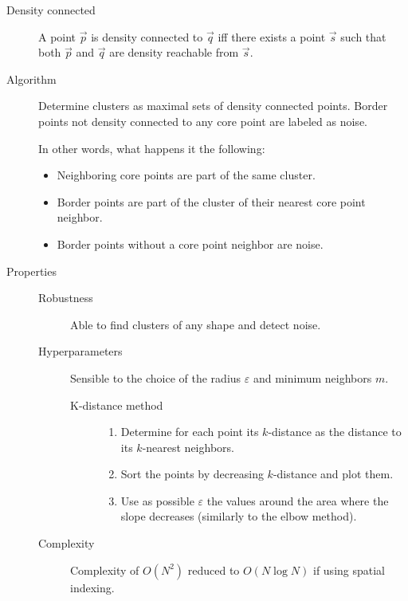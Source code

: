 \begin{description}
    \item[Density connected] 
        A point $\vec{p}$ is density connected to $\vec{q}$ iff there exists a point $\vec{s}$ 
        such that both $\vec{p}$ and $\vec{q}$ are density reachable from $\vec{s}$.

    \item[Algorithm] 
        Determine clusters as maximal sets of density connected points.
        Border points not density connected to any core point are labeled as noise.

        In other words, what happens it the following:
        \begin{itemize}
            \item Neighboring core points are part of the same cluster.
            \item Border points are part of the cluster of their nearest core point neighbor.
            \item Border points without a core point neighbor are noise.
        \end{itemize}

    \item[Properties] \phantom{}
        \begin{description}
            \item[Robustness]
                Able to find clusters of any shape and detect noise.

            \item[Hyperparameters]
                Sensible to the choice of the radius $\varepsilon$ and minimum neighbors $m$.

                \begin{description}
                    \item[K-distance method] \phantom{}
                        \begin{enumerate}
                            \item Determine for each point its $k$-distance as the distance to its $k$-nearest neighbors.
                            \item Sort the points by decreasing $k$-distance and plot them.
                            \item Use as possible $\varepsilon$ the values around the area where the slope decreases (similarly to the elbow method).
                        \end{enumerate}
                \end{description}

            \item[Complexity]
                Complexity of $O(N^2)$ reduced to $O(N \log N)$ if using spatial indexing.
        \end{description}
\end{description}


